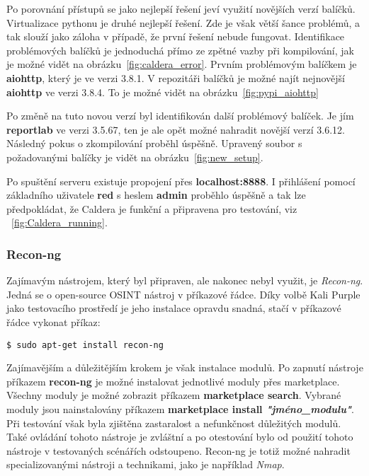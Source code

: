 Po porovnání přístupů se jako nejlepší řešení jeví využití novějších verzí balíčků.
Virtualizace pythonu je druhé nejlepší řešení.
Zde je však větší šance problémů, a tak slouží jako záloha v případě, že první řešení nebude fungovat.
Identifikace problémových balíčků je jednoduchá přímo ze zpětné vazby při kompilování, jak je možné vidět na obrázku~\ref{fig:caldera_error}.
Prvním problémovým balíčkem je \textbf{aiohttp}, který je ve verzi 3.8.1.
V repozitáři balíčků je možné najít nejnovější \textbf{aiohttp} ve verzi 3.8.4.
To je možné vidět na obrázku~\ref{fig:pypi_aiohttp}


Po změně na tuto novou verzí byl identifikován další problémový balíček.
Je jím \textbf{reportlab} ve verzi 3.5.67, ten je ale opět možné nahradit novější verzí 3.6.12.
Následný pokus o zkompilování proběhl úspěšně.
Upravený soubor s požadovanými balíčky je vidět na obrázku~\ref{fig:new_setup}.

Po spuštění serveru existuje propojení přes \textbf{localhost:8888}.
I přihlášení pomocí základního uživatele \textbf{red} s heslem \textbf{admin} proběhlo úspěšně a tak lze předpokládat, že Caldera je funkční a připravena pro testování, viz ~\ref{fig:Caldera_running}.

\subsubsection{Recon-ng}
Zajímavým nástrojem, který byl připraven, ale nakonec nebyl využit, je \textit{Recon-ng}.
Jedná se o open-source \ac{OSINT} nástroj v příkazové řádce.
Díky volbě Kali Purple jako testovacího prostředí je jeho instalace opravdu snadná, stačí v příkazové řádce vykonat příkaz:

\begin{codeblock}
	\begin{verbatim}
$ sudo apt-get install recon-ng
	\end{verbatim}
\end{codeblock}

Zajímavějším a důležitějším krokem je však instalace modulů.
Po zapnutí nástroje příkazem \textbf{recon-ng} je možné instalovat jednotlivé moduly přes marketplace.
Všechny moduly je možné zobrazit příkazem \textbf{marketplace search}.
Vybrané moduly jsou nainstalovány příkazem \textbf{marketplace install \textit{"jméno\_modulu"}}.
Při testování však byla zjištěna zastaralost a nefunkčnost důležitých modulů.
Také ovládání tohoto nástroje je zvláštní a po otestování bylo od použití tohoto nástroje v testovaných scénářích odstoupeno.
Recon-ng je totiž možné nahradit specializovanými nástroji a technikami, jako je například \textit{Nmap}.


